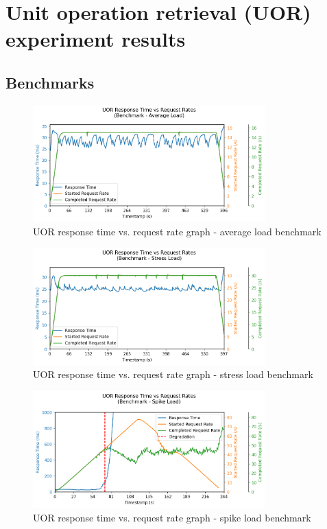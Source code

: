 \section{Unit operation retrieval (UOR) experiment results}

\subsection{Benchmarks}

\begin{figure}[H]
    
    \centering
    \includegraphics[width=0.8\textwidth]{figures/uor-benchmark-average.png}
    \caption{UOR response time vs. request rate graph - average load benchmark}
    \label{figure:uor-benchmark-average}
\end{figure}

\begin{figure}[H]
    \centering
    \includegraphics[width=0.8\textwidth]{figures/uor-benchmark-stress.png}
    \caption{UOR response time vs. request rate graph - stress load benchmark}
    \label{figure:uor-benchmark-stress}
\end{figure}

\begin{figure}[H]
    \centering
    \includegraphics[width=0.8\textwidth]{figures/uor-benchmark-spike.png}
    \caption{UOR response time vs. request rate graph - spike load benchmark}
    \label{figure:uor-benchmark-spike}
\end{figure}

